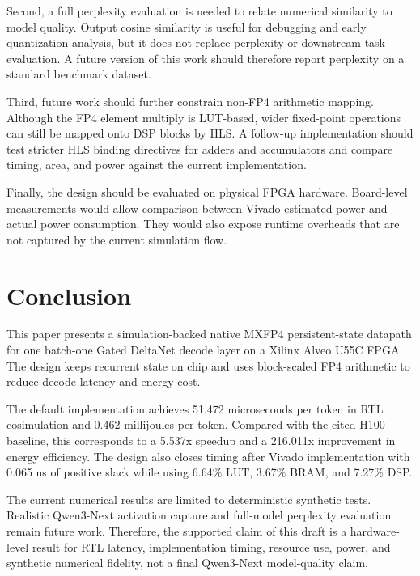 ﻿\documentclass[conference]{IEEEtran}
\begin{document}
Second, a full perplexity evaluation is needed to relate numerical similarity to model quality. Output cosine similarity is useful for debugging and early quantization analysis, but it does not replace perplexity or downstream task evaluation. A future version of this work should therefore report perplexity on a standard benchmark dataset.

Third, future work should further constrain non-FP4 arithmetic mapping. Although the FP4 element multiply is LUT-based, wider fixed-point operations can still be mapped onto DSP blocks by HLS. A follow-up implementation should test stricter HLS binding directives for adders and accumulators and compare timing, area, and power against the current implementation.

Finally, the design should be evaluated on physical FPGA hardware. Board-level measurements would allow comparison between Vivado-estimated power and actual power consumption. They would also expose runtime overheads that are not captured by the current simulation flow.

\section{Conclusion}
This paper presents a simulation-backed native MXFP4 persistent-state datapath for one batch-one Gated DeltaNet decode layer on a Xilinx Alveo U55C FPGA. The design keeps recurrent state on chip and uses block-scaled FP4 arithmetic to reduce decode latency and energy cost.

The default implementation achieves 51.472 microseconds per token in RTL cosimulation and 0.462 millijoules per token. Compared with the cited H100 baseline, this corresponds to a 5.537x speedup and a 216.011x improvement in energy efficiency. The design also closes timing after Vivado implementation with 0.065 ns of positive slack while using 6.64\% LUT, 3.67\% BRAM, and 7.27\% DSP.

The current numerical results are limited to deterministic synthetic tests. Realistic Qwen3-Next activation capture and full-model perplexity evaluation remain future work. Therefore, the supported claim of this draft is a hardware-level result for RTL latency, implementation timing, resource use, power, and synthetic numerical fidelity, not a final Qwen3-Next model-quality claim.
\end{document}
